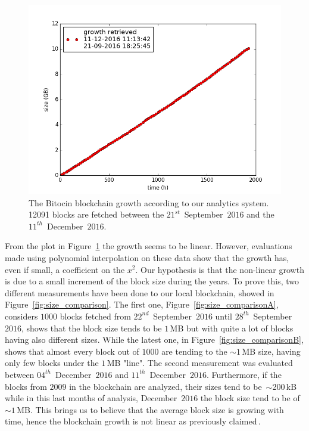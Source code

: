 \documentclass[USenglish]{uit-thesis}
\begin{document}
\begin{figure}[h!]
	\centering
	\includegraphics[width=1\textwidth]{img/growth_blockchain}
	\caption{The Bitocin blockchain growth according to our analytics system.
		12091 blocks are fetched between the $21^{st}$~September~$2016$ and the $11^{th}$~December~$2016$.}
	\label{fig:growth_blockchain}
\end{figure}

From the plot in Figure~\ref{fig:growth_blockchain} the growth seems to be linear.
However, evaluations made using polynomial interpolation on these data show that the growth has,
even if small, a coefficient on the $x^2$. Our hypothesis is that the non-linear growth
is due to a small increment of the block size during the years.
To prove this, two different measurements have been done to our local blockchain, showed in
Figure~\ref{fig:size_comparison}. The first one, Figure~\ref{fig:size_comparisonA},
considers $1000$ blocks fetched from $22^{nd}$~September~$2016$ until
$28^{th}$~September~$2016$, shows that the block size tends to be $1$\,MB
but with quite a lot of blocks having also different sizes. While the latest one, in Figure~\ref{fig:size_comparisonB},
shows that almost every block out of $1000$ are tending to the $\sim1$\,MB size, having only few blocks under
the $1$\,MB "line". The second measurement was evaluated between $04^{th}$~December~$2016$ and
$11^{th}$~December~$2016$.
Furthermore, if the blocks from $2009$ in the blockchain are analyzed, their sizes tend
to be~$\sim$200\,kB while in this last months of analysis, December~$2016$ the block size tend to be of $\sim1$\,MB.
This brings us to believe that the average block size is growing with time,
hence the blockchain growth is not linear as previously claimed\,\cite{ethereum_white_paper}. 
\end{document}
